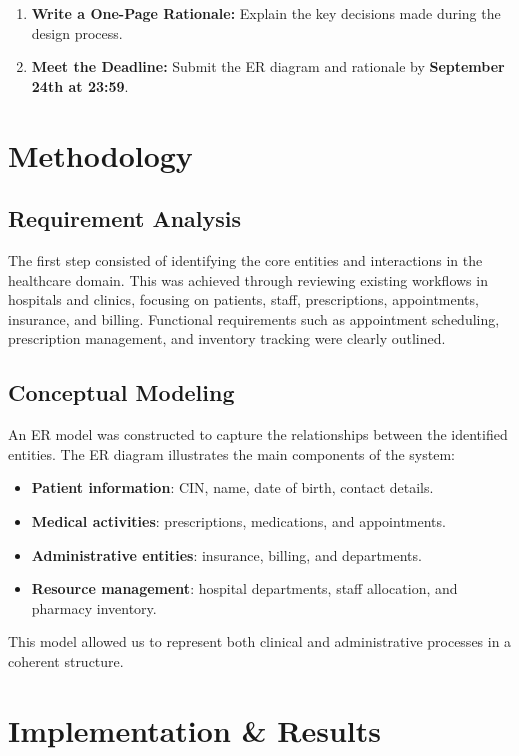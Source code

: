 \documentclass[a4paper,12pt]{article}
\begin{document}
\begin{enumerate}
    \item \textbf{Write a One-Page Rationale:} Explain the key decisions made during the design process.
    
    \item \textbf{Meet the Deadline:} Submit the ER diagram and rationale by \textbf{September 24th at 23:59}.
\end{enumerate}

\section{Methodology}
\subsection{Requirement Analysis}

The first step consisted of identifying the core entities and interactions in the healthcare domain. This was achieved through reviewing existing workflows in hospitals and clinics, focusing on patients, staff, prescriptions, appointments, insurance, and billing. Functional requirements such as appointment scheduling, prescription management, and inventory tracking were clearly outlined.

\subsection{Conceptual Modeling}

An ER model was constructed to capture the relationships between the identified entities. The ER diagram illustrates the main components of the system:

\begin{itemize}
    \item \textbf{Patient information}: CIN, name, date of birth, contact details.
    \item \textbf{Medical activities}: prescriptions, medications, and appointments.
    \item \textbf{Administrative entities}: insurance, billing, and departments.
    \item \textbf{Resource management}: hospital departments, staff allocation, and pharmacy inventory.
\end{itemize}

This model allowed us to represent both clinical and administrative processes in a coherent structure.

\section{Implementation \& Results}
\end{document}
